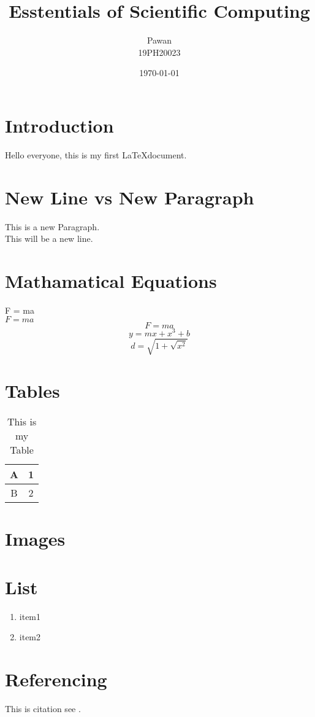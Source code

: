 \documentclass[12pt]{article}
\begin{document}
\title{Esstentials of Scientific Computing}
\author{Pawan\\19PH20023}
\date{\today}
\maketitle

\section{Introduction}
Hello everyone, this is my first \LaTeX document.

\section{New Line vs New Paragraph}
This is a new Paragraph.\\
This will be a new line.

\section{Mathamatical Equations}
F = ma\\
$F=ma$
$$F = ma $$
$$y = mx + x^3 + b$$
$$d = \sqrt{1 + \sqrt{x^2}}$$

\newpage
\section{Tables}
\begin{table}[h!]
    \centering
    \begin{tabular}{|c|c|}
        \hline
        A & 1 \\ \hline
        B & 2 \\ \hline
    \end{tabular}
    \caption{This is my Table}
\end{table}

\section{Images}

\section{List}
\begin{enumerate}
    \item item1
    \item item2
\end{enumerate}

\section{Referencing}
This is citation see \cite{aghaie2023bounds}.





\end{document}
